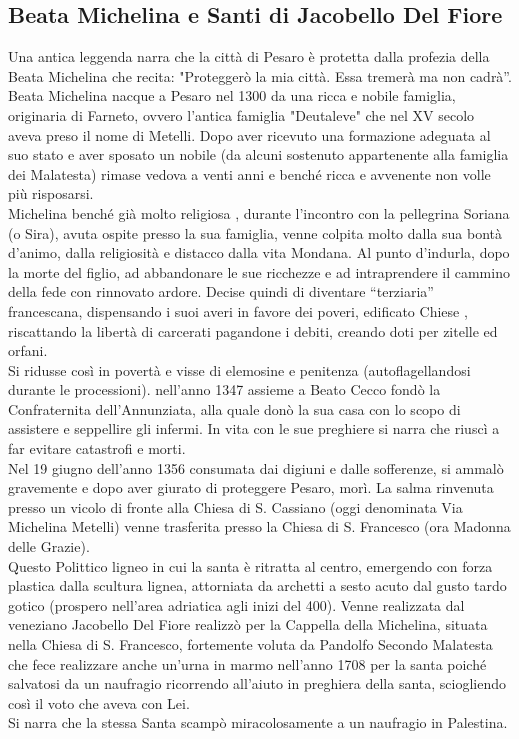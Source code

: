 \documentclass[hidelinks,12pt,a4paper]{article}
\begin{document}
\begin{flushleft}
			\subsection{Beata Michelina e Santi di Jacobello Del Fiore}
			Una antica leggenda narra che la città di Pesaro è protetta dalla profezia della Beata Michelina che recita: "Proteggerò la mia città. Essa tremerà ma non cadrà”.\\
			Beata Michelina nacque a Pesaro nel 1300 da una ricca e nobile famiglia, originaria di Farneto, ovvero l’antica famiglia "Deutaleve" che nel XV secolo aveva preso il nome di Metelli. Dopo aver ricevuto una formazione adeguata al suo stato e aver sposato un nobile (da alcuni sostenuto appartenente alla famiglia dei Malatesta) rimase vedova a venti anni e benché ricca e avvenente non volle più risposarsi.\\
			Michelina benché già molto religiosa , durante l'incontro con la  pellegrina Soriana (o Sira), avuta ospite presso la sua famiglia, venne colpita molto dalla sua bontà d'animo, dalla religiosità e distacco dalla vita Mondana. Al punto d'indurla, dopo la morte del figlio, ad abbandonare le sue ricchezze e ad intraprendere il cammino della fede con rinnovato ardore. Decise quindi di diventare “terziaria” francescana, dispensando i suoi averi in favore dei poveri, edificato Chiese , riscattando la libertà di carcerati pagandone i debiti, creando doti per zitelle ed orfani.\\
			Si ridusse così in povertà e visse di elemosine e penitenza (autoflagellandosi durante le processioni). nell'anno 1347 assieme a Beato Cecco fondò la Confraternita dell'Annunziata, alla quale donò la sua casa con lo scopo di assistere e seppellire gli infermi. In vita con le sue preghiere si narra che riuscì a far evitare catastrofi e morti.\\
			Nel 19 giugno dell'anno 1356 consumata dai digiuni e dalle sofferenze, si ammalò gravemente e dopo aver giurato di proteggere Pesaro, morì. La salma rinvenuta presso un vicolo di fronte alla Chiesa di S. Cassiano (oggi denominata Via Michelina Metelli) venne trasferita presso la Chiesa di S. Francesco (ora Madonna delle Grazie).\\
			Questo Polittico ligneo in cui la santa è ritratta al centro, emergendo con forza plastica dalla scultura lignea, attorniata da archetti a sesto acuto dal gusto tardo gotico (prospero nell'area adriatica agli inizi del 400). Venne realizzata dal veneziano Jacobello Del Fiore realizzò per la Cappella della Michelina, situata nella Chiesa di S. Francesco, fortemente voluta da Pandolfo Secondo Malatesta che fece realizzare anche un'urna in marmo nell'anno 1708 per la santa poiché salvatosi da un naufragio ricorrendo all'aiuto in preghiera della santa, sciogliendo così il voto che aveva con Lei.\\
			Si narra che la stessa Santa scampò miracolosamente a un naufragio in Palestina.
	

\end{flushleft}
\end{document}

